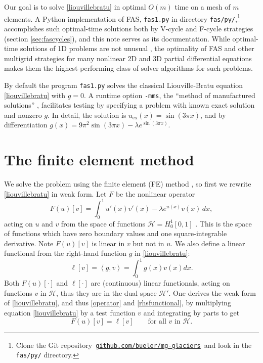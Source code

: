 \documentclass[letterpaper,final,12pt,reqno]{amsart}
\newcommand{\ip}[2]{\left<#1,#2\right>}
\begin{document}
Our goal is to solve \eqref{liouvillebratu} in optimal $O(m)$ time on a mesh of $m$ elements.  A Python implementation of FAS, \texttt{fas1.py} in directory \texttt{fas/py/},\footnote{Clone the Git repository\, \href{https://github.com/bueler/mg-glaciers}{\texttt{github.com/bueler/mg-glaciers}}\, and look in the \texttt{fas/py/} directory.} accomplishes such optimal-time solutions both by V-cycle and F-cycle strategies (section \ref{sec:fascycles}), and this note serves as its documentation.  While optimal-time solutions of 1D problems are not unusual \cite{Bueler2021}, the optimality of FAS and other multigrid strategies for many nonlinear 2D and 3D partial differential equations makes them the highest-performing class of solver algorithms for such problems.

By default the program \texttt{fas1.py} solves the classical Liouville-Bratu equation \eqref{liouvillebratu} with $g=0$.  A runtime option \texttt{-mms}, the ``method of manufactured solutions'' \cite{Bueler2021}, facilitates testing by specifying a problem with known exact solution and nonzero $g$.  In detail, the solution is $u_{\text{ex}}(x)=\sin(3\pi x)$, and by differentiation $g(x)=9\pi^2 \sin(3\pi x) - \lambda e^{\sin(3\pi x)}$.


\section{The finite element method}  \label{sec:femethod}

We solve the problem using the finite element (FE) method \cite{Bueler2021,Elmanetal2014}, so first we rewrite \eqref{liouvillebratu} in weak form.  Let $F$ be the nonlinear operator
\begin{equation}
  F(u)[v] = \int_0^1 u'(x) v'(x) - \lambda e^{u(x)} v(x)\, dx,  \label{operator}
\end{equation}
acting on $u$ and $v$ from the space of functions $\mathcal{H}=H_0^1[0,1]$ \cite{Evans2010}.  This is the space of functions which have zero boundary values and one square-integrable derivative.  Note $F(u)[v]$ is linear in $v$ but not in $u$.  We also define a linear functional from the right-hand function $g$ in \eqref{liouvillebratu}:
\begin{equation}
  \ell[v] = \ip{g}{v} = \int_0^1 g(x) v(x) dx.  \label{rhsfunctional}
\end{equation}
Both $F(u)[\cdot]$ and $\ell[\cdot]$ are (continuous) linear functionals, acting on functions $v$ in $\mathcal{H}$, thus they are in the dual space $\mathcal{H}'$.  One derives the weak form of \eqref{liouvillebratu}, and thus \eqref{operator} and \eqref{rhsfunctional}, by multiplying equation \eqref{liouvillebratu} by a test function $v$ and integrating by parts to get
\begin{equation}
  F(u)[v] = \ell[v] \qquad \text{for all $v$ in $\mathcal{H}$.} \label{weakform}
\end{equation}
\end{document}
